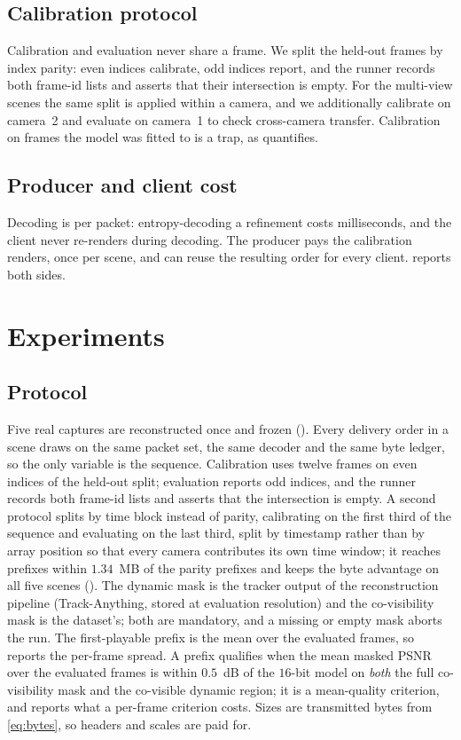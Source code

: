 \documentclass[lettersize,journal]{IEEEtran}
\begin{document}
\subsection{Calibration protocol}
\label{sec:calib}
Calibration and evaluation never share a frame. We split the held-out frames by
index parity: even indices calibrate, odd indices report, and the runner records
both frame-id lists and asserts that their intersection is empty. For the
multi-view scenes the same split is applied within a camera, and we additionally
calibrate on camera~2 and evaluate on camera~1 to check cross-camera transfer.
Calibration on frames the model was fitted to is a trap, as
 quantifies.

\subsection{Producer and client cost}
\label{sec:decode}
Decoding is per packet: entropy-decoding a refinement costs milliseconds, and the
client never re-renders during decoding. The producer pays the calibration
renders, once per scene, and can reuse the resulting order for every client.
 reports both sides.

\section{Experiments}
\label{sec:exp}

\subsection{Protocol}
\label{sec:protocol}
Five real captures are reconstructed once and frozen (). Every
delivery order in a scene draws on the same packet set, the same decoder and the
same byte ledger, so the only variable is the sequence. Calibration uses twelve frames on even indices of the held-out split;
evaluation reports odd indices, and the runner records both frame-id lists and
asserts that the intersection is empty. A second protocol splits by time block
instead of parity, calibrating on the first third of the sequence and evaluating
on the last third, split by timestamp rather than by array position so that every
camera contributes its own time window; it reaches prefixes within $1.34$~MB of the
parity prefixes and keeps the byte advantage on all five scenes (). The dynamic mask is the tracker
output of the reconstruction pipeline (Track-Anything, stored at evaluation
resolution) and the co-visibility mask is the dataset's; both are mandatory, and
a missing or empty mask aborts the run. The first-playable prefix is the mean
over the evaluated frames, so  reports the per-frame spread. A prefix qualifies when the mean masked PSNR over the evaluated frames is
within $0.5$~dB of the $16$-bit model on \emph{both} the full co-visibility mask
and the co-visible dynamic region; it is a mean-quality criterion, and
 reports what a per-frame criterion costs. Sizes are transmitted bytes from
\eqref{eq:bytes}, so headers and scales are paid for.
\end{document}
